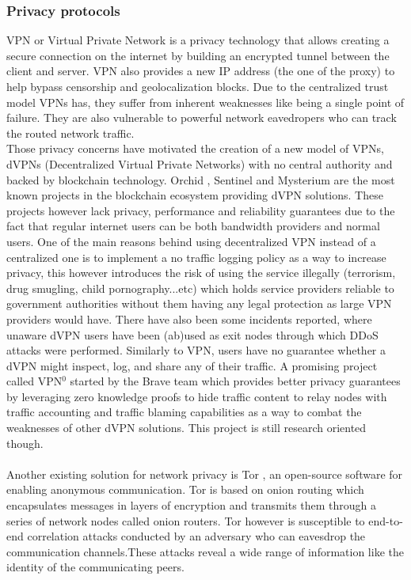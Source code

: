\subsubsection{Privacy protocols}
VPN or Virtual Private Network is a privacy technology that allows creating a secure connection on the internet by building an encrypted tunnel between the client and server. VPN also provides a new IP address (the one of the proxy) to help bypass censorship and geolocalization blocks.
Due to the centralized trust model VPNs has, they suffer from inherent weaknesses like being a single point of failure. They are also vulnerable to powerful network eavedropers who can track the routed network traffic.
\\Those privacy concerns have motivated the creation of a new model of VPNs, dVPNs (Decentralized Virtual Private Networks) with no central authority and backed by blockchain technology. Orchid \cite{orchid}, Sentinel \cite{sentinel} and Mysterium \cite{mysterium} are the most known projects in the blockchain ecosystem providing dVPN solutions. These projects however lack privacy, performance and reliability guarantees due to the fact that regular internet users can be both bandwidth providers and normal users. One of the main reasons behind using decentralized VPN instead of a centralized one is to implement a no traffic logging policy as a way to increase privacy, this however introduces the risk of using the service illegally (terrorism, drug smugling, child pornography...etc) which holds service providers reliable to government authorities without them having any legal protection as large VPN providers would have. There have also been some incidents reported, where unaware dVPN users have been (ab)used as exit nodes through which DDoS attacks were performed. Similarly to VPN, users have no guarantee whether a dVPN might inspect, log, and share any of their traffic. A promising project called VPN$^0$ \cite{vpn0} started by the Brave team which provides better privacy guarantees by leveraging zero knowledge proofs to hide traffic content to relay nodes with traffic accounting and traffic blaming capabilities as a way to combat the weaknesses of other dVPN solutions. This project is still research oriented though.
\\~\\ Another existing solution for network privacy is Tor \cite{tor}, an open-source software for enabling anonymous communication. Tor is based on onion routing which encapsulates messages in layers of encryption and transmits them through a series of network nodes called onion routers. Tor however is susceptible to end-to-end correlation attacks conducted by an adversary who can eavesdrop the communication channels.These attacks reveal a wide range of information like the identity of the communicating peers.
